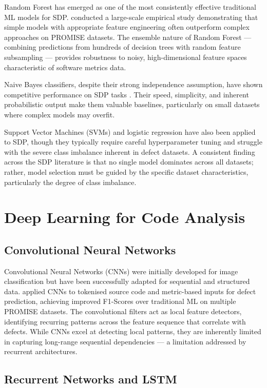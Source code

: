 \documentclass[12pt,a4paper,oneside]{report}
\begin{document}
Random Forest has emerged as one of the most consistently effective traditional ML models for SDP. \citet{menzies2010} conducted a large-scale empirical study demonstrating that simple models with appropriate feature engineering often outperform complex approaches on PROMISE datasets. The ensemble nature of Random Forest --- combining predictions from hundreds of decision trees with random feature subsampling --- provides robustness to noisy, high-dimensional feature spaces characteristic of software metrics data.

Naive Bayes classifiers, despite their strong independence assumption, have shown competitive performance on SDP tasks \citep{menzies2010}. Their speed, simplicity, and inherent probabilistic output make them valuable baselines, particularly on small datasets where complex models may overfit.

Support Vector Machines (SVMs) and logistic regression have also been applied to SDP, though they typically require careful hyperparameter tuning and struggle with the severe class imbalance inherent in defect datasets. A consistent finding across the SDP literature is that no single model dominates across all datasets; rather, model selection must be guided by the specific dataset characteristics, particularly the degree of class imbalance.

\section{Deep Learning for Code Analysis}

\subsection{Convolutional Neural Networks}

Convolutional Neural Networks (CNNs) were initially developed for image classification but have been successfully adapted for sequential and structured data. \citet{li2017} applied CNNs to tokenised source code and metric-based inputs for defect prediction, achieving improved F1-Scores over traditional ML on multiple PROMISE datasets. The convolutional filters act as local feature detectors, identifying recurring patterns across the feature sequence that correlate with defects. While CNNs excel at detecting local patterns, they are inherently limited in capturing long-range sequential dependencies --- a limitation addressed by recurrent architectures.

\subsection{Recurrent Networks and LSTM}
\end{document}

